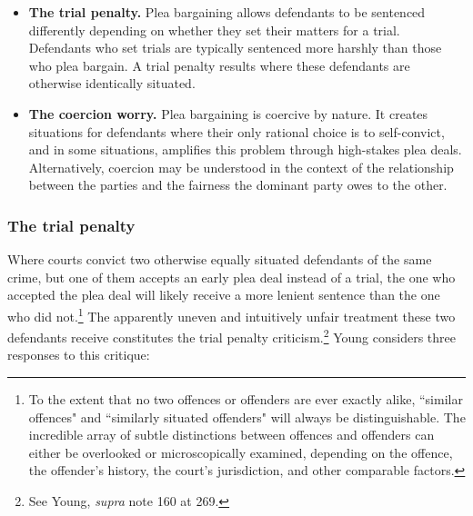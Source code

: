\begin{itemize}
    \item \textbf{The trial penalty.} Plea bargaining allows defendants to be sentenced differently depending on whether they set their matters for a trial. Defendants who set trials are typically sentenced more harshly than those who plea bargain. A trial penalty results where these defendants are otherwise identically situated.
    \item \textbf{The coercion worry.} Plea bargaining is coercive by nature. It creates situations for defendants where their only rational choice is to self-convict, and in some situations, amplifies this problem through high-stakes plea deals. Alternatively, coercion may be understood in the context of the relationship between the parties and the fairness the dominant party owes to the other.
\end{itemize}

\subsubsection{The trial penalty}

Where courts convict two otherwise equally situated defendants of the same crime, but one of them accepts an early plea deal instead of a trial, the one who accepted the plea deal will likely receive a more lenient sentence than the one who did not.\footnote{To the extent that no two offences or offenders are ever exactly alike, ``similar offences" and ``similarly situated offenders" will always be distinguishable. The incredible array of subtle distinctions between offences and offenders can either be overlooked or microscopically examined, depending on the offence, the offender's history, the court's jurisdiction, and other comparable factors.} The apparently uneven and intuitively unfair treatment these two defendants receive constitutes the trial penalty criticism.\footnote{See Young, \textit{supra} note 160 at 269.} Young considers three responses to this critique:

